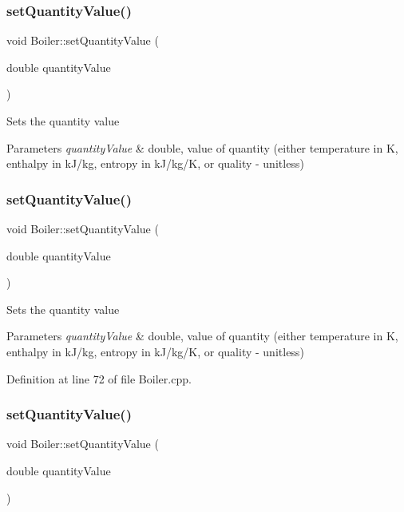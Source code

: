 \subsubsection{\texorpdfstring{set\+Quantity\+Value()}{setQuantityValue()}\hspace{0.1cm}{\footnotesize\ttfamily [1/3]}}
{\footnotesize\ttfamily void Boiler\+::set\+Quantity\+Value (\begin{DoxyParamCaption}\item[{double}]{quantity\+Value }\end{DoxyParamCaption})}

Sets the quantity value 
\begin{DoxyParams}{Parameters}
{\em quantity\+Value} & double, value of quantity (either temperature in K, enthalpy in k\+J/kg, entropy in k\+J/kg/K, or quality -\/ unitless) \\
\hline
\end{DoxyParams}
\mbox{\label{class_boiler_ac3450d88dba124529d59baf62c39e14a}} 
\subsubsection{\texorpdfstring{set\+Quantity\+Value()}{setQuantityValue()}\hspace{0.1cm}{\footnotesize\ttfamily [2/3]}}
{\footnotesize\ttfamily void Boiler\+::set\+Quantity\+Value (\begin{DoxyParamCaption}\item[{double}]{quantity\+Value }\end{DoxyParamCaption})}

Sets the quantity value 
\begin{DoxyParams}{Parameters}
{\em quantity\+Value} & double, value of quantity (either temperature in K, enthalpy in k\+J/kg, entropy in k\+J/kg/K, or quality -\/ unitless) \\
\hline
\end{DoxyParams}


Definition at line 72 of file Boiler.\+cpp.

\mbox{\label{class_boiler_ac3450d88dba124529d59baf62c39e14a}} 
\subsubsection{\texorpdfstring{set\+Quantity\+Value()}{setQuantityValue()}\hspace{0.1cm}{\footnotesize\ttfamily [3/3]}}
{\footnotesize\ttfamily void Boiler\+::set\+Quantity\+Value (\begin{DoxyParamCaption}\item[{double}]{quantity\+Value }\end{DoxyParamCaption})}

